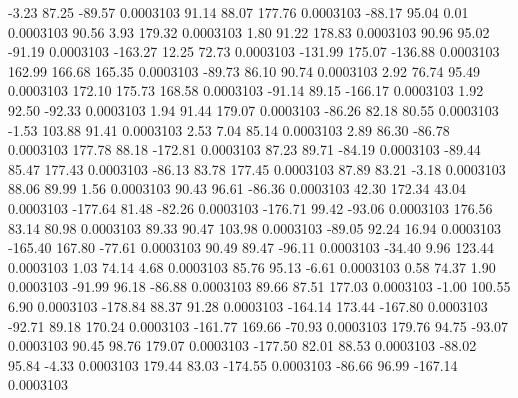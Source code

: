        -3.23       87.25      -89.57     0.0003103
       91.14       88.07      177.76     0.0003103
      -88.17       95.04        0.01     0.0003103
       90.56        3.93      179.32     0.0003103
        1.80       91.22      178.83     0.0003103
       90.96       95.02      -91.19     0.0003103
     -163.27       12.25       72.73     0.0003103
     -131.99      175.07     -136.88     0.0003103
      162.99      166.68      165.35     0.0003103
      -89.73       86.10       90.74     0.0003103
        2.92       76.74       95.49     0.0003103
      172.10      175.73      168.58     0.0003103
      -91.14       89.15     -166.17     0.0003103
        1.92       92.50      -92.33     0.0003103
        1.94       91.44      179.07     0.0003103
      -86.26       82.18       80.55     0.0003103
       -1.53      103.88       91.41     0.0003103
        2.53        7.04       85.14     0.0003103
        2.89       86.30      -86.78     0.0003103
      177.78       88.18     -172.81     0.0003103
       87.23       89.71      -84.19     0.0003103
      -89.44       85.47      177.43     0.0003103
      -86.13       83.78      177.45     0.0003103
       87.89       83.21       -3.18     0.0003103
       88.06       89.99        1.56     0.0003103
       90.43       96.61      -86.36     0.0003103
       42.30      172.34       43.04     0.0003103
     -177.64       81.48      -82.26     0.0003103
     -176.71       99.42      -93.06     0.0003103
      176.56       83.14       80.98     0.0003103
       89.33       90.47      103.98     0.0003103
      -89.05       92.24       16.94     0.0003103
     -165.40      167.80      -77.61     0.0003103
       90.49       89.47      -96.11     0.0003103
      -34.40        9.96      123.44     0.0003103
        1.03       74.14        4.68     0.0003103
       85.76       95.13       -6.61     0.0003103
        0.58       74.37        1.90     0.0003103
      -91.99       96.18      -86.88     0.0003103
       89.66       87.51      177.03     0.0003103
       -1.00      100.55        6.90     0.0003103
     -178.84       88.37       91.28     0.0003103
     -164.14      173.44     -167.80     0.0003103
      -92.71       89.18      170.24     0.0003103
     -161.77      169.66      -70.93     0.0003103
      179.76       94.75      -93.07     0.0003103
       90.45       98.76      179.07     0.0003103
     -177.50       82.01       88.53     0.0003103
      -88.02       95.84       -4.33     0.0003103
      179.44       83.03     -174.55     0.0003103
      -86.66       96.99     -167.14     0.0003103
